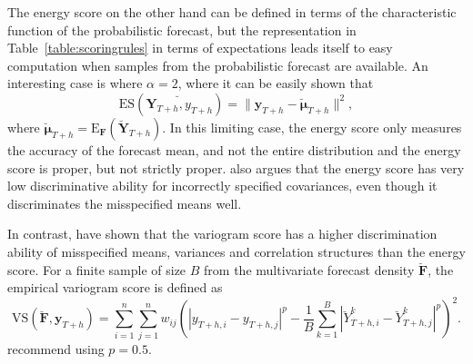 \documentclass[a4paper, 11pt]{article}
\def\E{\text{E}}
\theoremstyle{theo}
\theoremstyle{definition}
\begin{document}
The energy score on the other hand can be defined in terms of the characteristic function of the probabilistic forecast, but the representation in Table~\ref{table:scoringrules} in terms of expectations leads itself to easy computation when samples from the probabilistic forecast are available. 
An interesting case is where $\alpha=2$, where it can be easily shown that
\begin{equation} \label{eq:(5.1)}
\text{ES}(\breve{\bm{Y}_{T+h},y_{T+h}}) = \|\bm{y}_{T+h}-\breve{\bm{\mu}}_{T+h}\|^2,
\end{equation}
where $\breve{\bm{\mu}}_{T+h} =\E_{\bm{F}}(\breve{\bm{Y}}_{T+h}) $. In this limiting case, the energy score only measures the accuracy of the forecast mean, and not the entire distribution and the energy score is proper, but not strictly proper. \citet{Pinson2013a} also argues that the energy score has very low discriminative ability for incorrectly specified covariances, even though it discriminates the misspecified means well.

In contrast, \citet{SCHEUERER2015} have shown that the variogram score has a higher discrimination ability of misspecified means, variances and correlation structures than the energy score. For a finite sample of size $B$ from the multivariate forecast density $\breve{\bm{F}}$, the empirical variogram score is defined as
\begin{equation}
\text{VS}(\breve{\bm{F}}, \bm{y}_{T+h}) = \displaystyle\sum_{i=1}^{n}\displaystyle\sum_{j=1}^{n}w_{ij}\left(|y_{T+h,i} - y_{T+h,j}|^p - \frac{1}{B} \displaystyle\sum_{k=1}^{B} |\breve{Y}^k_{T+h,i}-\breve{Y}^k_{T+h,j}|^p\right)^2.
\end{equation}
\citet{SCHEUERER2015} recommend using $p=0.5$. 



%
\end{document}
